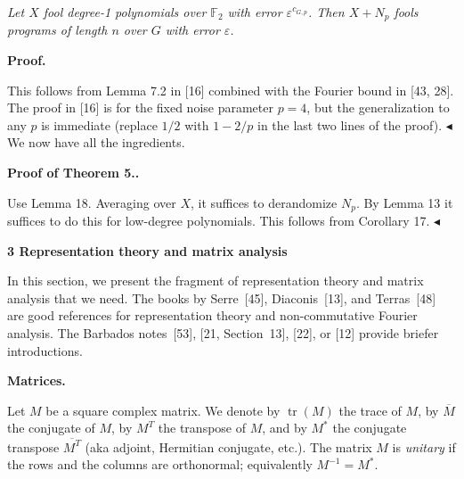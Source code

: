 \documentclass[10pt,a4paper]{article}
\begin{document}
\emph{Let $X$ fool degree-1 polynomials over $\mathbb{F}_{2}$
with error $\varepsilon^{c_{G,p}}$. Then $X+N_{p}$ fools programs of length $n$ over $G$
with error $\varepsilon$.}\par







\par\medskip\noindent\textbf{Proof.}\par




This follows from Lemma 7.2 in [16] combined
with the Fourier bound in [43, 28].
The proof in [16]
is for the fixed noise parameter $p=4$, but the generalization
to any $p$ is immediate (replace $1/2$ with $1-2/p$ in the last
two lines of the proof).
$\blacktriangleleft$
We now have all the ingredients.\par





\par\medskip\noindent\textbf{Proof of Theorem 5..}\par




Use Lemma 18. Averaging over $X$, it suffices to derandomize
$N_{p}$. By Lemma 13 it suffices to do this
for low-degree polynomials. This follows from Corollary 17.
$\blacktriangleleft$\par






\par\medskip\noindent\textbf{
3 Representation theory and matrix analysis}\par




In this section, we present the fragment of representation theory and matrix analysis that we need. The books by Serre [45], Diaconis [13], and Terras [48] are good references for representation theory and
non-commutative Fourier analysis. The Barbados notes [53], [21, Section 13], [22], or [12] provide briefer introductions.\par




\par\medskip\noindent\textbf{Matrices.}\par




Let $M$ be a square complex matrix. We denote by $\operatorname{tr}(M)$
the trace of $M$, by $\overline{M}$ the conjugate of $M$, by $M^{T}$
the transpose of $M$, and by $M^{*}$ the conjugate transpose $\overline{M^{T}}$
(aka adjoint, Hermitian conjugate, etc.). The matrix $M$ is \emph{unitary}
if the rows and the columns are orthonormal; equivalently $M^{-1}=M^{*}$.\par
\end{document}
